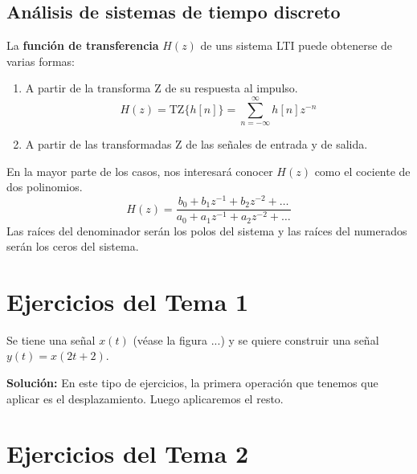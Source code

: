 \documentclass[a4paper]{book}
\begin{document}
\section{Análisis de sistemas de tiempo discreto}
La \textbf{función de transferencia} $H(z)$ de uns sistema LTI puede obtenerse de varias formas:
\begin{enumerate}
\item A partir de la transforma Z de su respuesta al impulso.
\[H(z) = \text{TZ}\{ h[n]\} = \sum_{n=-\infty}^{\infty}h[n]z^{-n}\]
\item A partir de las transformadas Z de las señales de entrada y de salida.

\begin{figure}[!ht]
\centering
{}
\caption{}
\end{figure}
\end{enumerate}

En la mayor parte de los casos, nos interesará conocer $H(z)$ como el cociente de dos polinomios.
\[H(z) = \frac{b_0 +b_1z^{-1}+b_2z^{-2}+\dots}{a_0 +a_1z^{-1}+a_2z^{-2}+\dots}\]
Las raíces del denominador serán los polos del sistema y las raíces del numerados serán los ceros del sistema.


\appendix
\chapter{Ejercicios del Tema 1}
\begin{ejercicio} \label{ej001}
Se tiene una señal $x(t)$ (véase la figura ...) y se quiere construir una señal $y(t) =x(2t+2)$.
\end{ejercicio}
\textbf{Solución:} En este tipo de ejercicios, la primera operación que tenemos que aplicar es el desplazamiento. Luego aplicaremos el resto.

\chapter{Ejercicios del Tema 2}
\end{document}
